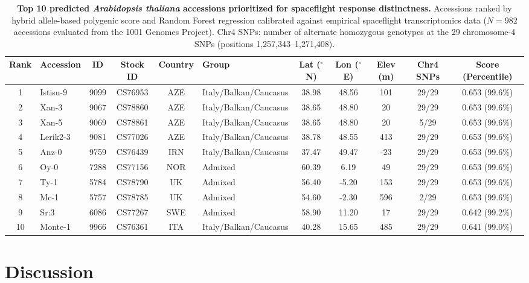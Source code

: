 \documentclass[sn-mathphys-num,Basic]{sn-jnl}
\begin{document}
\begin{table}[t]
\centering
\caption{\textbf{Top 10 predicted \textit{Arabidopsis thaliana} accessions prioritized for spaceflight response distinctness.} Accessions ranked by hybrid allele-based polygenic score and Random Forest regression calibrated against empirical spaceflight transcriptomics data ($N = 982$ accessions evaluated from the 1001 Genomes Project). Chr4 SNPs: number of alternate homozygous genotypes at the 29 chromosome-4 SNPs (positions 1,257,343--1,271,408).}
\label{tab:top10_ecotypes}
\small
\begin{tabular}{c l c c c l c c c c c}
\hline
\textbf{Rank} & \textbf{Accession} & \textbf{ID} & \textbf{Stock ID} & \textbf{Country} & \textbf{Group} & \textbf{Lat ($^\circ$N)} & \textbf{Lon ($^\circ$E)} & \textbf{Elev (m)} & \textbf{Chr4 SNPs} & \textbf{Score (Percentile)} \\
\hline
1 & Istisu-9 & 9099 & CS76953 & AZE & Italy/Balkan/Caucasus & 38.98 & 48.56 & 101 & 29/29 & 0.653 (99.6\%) \\
2 & Xan-3 & 9067 & CS78860 & AZE & Italy/Balkan/Caucasus & 38.65 & 48.80 & 20 & 29/29 & 0.653 (99.6\%) \\
3 & Xan-5 & 9069 & CS78861 & AZE & Italy/Balkan/Caucasus & 38.65 & 48.80 & 20 & 5/29 & 0.653 (99.6\%) \\
4 & Lerik2-3 & 9081 & CS77026 & AZE & Italy/Balkan/Caucasus & 38.78 & 48.55 & 413 & 29/29 & 0.653 (99.6\%) \\
5 & Anz-0 & 9759 & CS76439 & IRN & Italy/Balkan/Caucasus & 37.47 & 49.47 & -23 & 29/29 & 0.653 (99.6\%) \\
6 & Oy-0 & 7288 & CS77156 & NOR & Admixed & 60.39 & 6.19 & 49 & 29/29 & 0.653 (99.6\%) \\
7 & Ty-1 & 5784 & CS78790 & UK & Admixed & 56.40 & -5.20 & 153 & 29/29 & 0.653 (99.6\%) \\
8 & Mc-1 & 5757 & CS78785 & UK & Admixed & 54.60 & -2.30 & 596 & 2/29 & 0.653 (99.6\%) \\
9 & Sr:3 & 6086 & CS77267 & SWE & Admixed & 58.90 & 11.20 & 17 & 29/29 & 0.642 (99.2\%) \\
10 & Monte-1 & 9966 & CS76361 & ITA & Italy/Balkan/Caucasus & 40.28 & 15.65 & 485 & 29/29 & 0.641 (99.0\%) \\
\hline
\end{tabular}
\end{table}

\section{Discussion}
\end{document}
